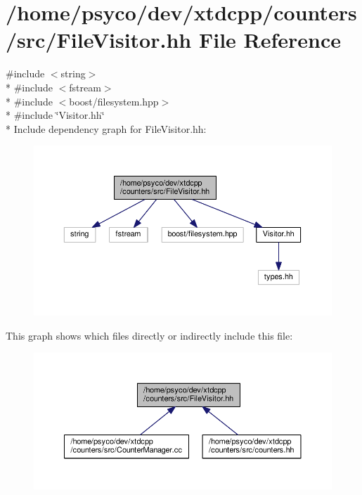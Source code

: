 \hypertarget{FileVisitor_8hh}{}\section{/home/psyco/dev/xtdcpp/counters/src/\+File\+Visitor.hh File Reference}
\label{FileVisitor_8hh}
{\ttfamily \#include $<$string$>$}\\*
{\ttfamily \#include $<$fstream$>$}\\*
{\ttfamily \#include $<$boost/filesystem.\+hpp$>$}\\*
{\ttfamily \#include \char`\"{}Visitor.\+hh\char`\"{}}\\*
Include dependency graph for File\+Visitor.\+hh\+:
\nopagebreak
\begin{figure}[H]
\begin{center}
\leavevmode
\includegraphics[width=350pt]{FileVisitor_8hh__incl}
\end{center}
\end{figure}
This graph shows which files directly or indirectly include this file\+:
\nopagebreak
\begin{figure}[H]
\begin{center}
\leavevmode
\includegraphics[width=350pt]{FileVisitor_8hh__dep__incl}
\end{center}
\end{figure}
